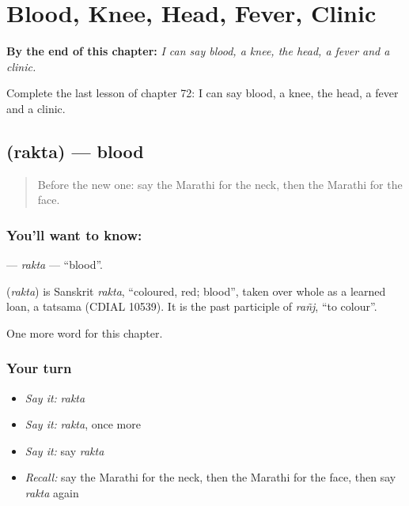 
\chapter{Blood, Knee, Head, Fever, Clinic}
\label{ch:mr-blood-knee-head-fever-clinic}

\begin{chapteropening}
\textbf{By the end of this chapter:} \emph{I can say blood, a knee, the head, a fever and a clinic.}

Complete the last lesson of chapter 72: I can say blood, a knee, the head, a fever and a clinic.
\end{chapteropening}

\section[\texorpdfstring{\mr{रक्त} (rakta)}{रक्त (rakta)}]{ (rakta) — blood}

\label{lesson:MR-C72-rakta}



\begin{quote}
Before the new one: say the Marathi for the neck, then the Marathi for the face.
\end{quote}

\subsection*{You'll want to know: }
\textbf{} — \emph{rakta} — \textquotedblleft{}blood\textquotedblright{}.

\begin{cousinweb}
\textbf{} (\emph{rakta}) is Sanskrit \emph{rakta}, \textquotedblleft{}coloured, red; blood\textquotedblright{}, taken over whole as a learned loan, a tatsama (CDIAL 10539). It is the past participle of \emph{rañj}, \textquotedblleft{}to colour\textquotedblright{}.
\end{cousinweb}

\begin{grammarlens}[title={What you've built}]
One more word for this chapter.
\end{grammarlens}

\subsection*{Your turn}
\begin{itemize}
\raggedright
  \item \emph{Say it:} \emph{rakta}
  \item \emph{Say it:} \emph{rakta}, once more
  \item \emph{Say it:} say \emph{rakta}
  \item \emph{Recall:} say the Marathi for the neck, then the Marathi for the face, then say \emph{rakta} again
\end{itemize}

